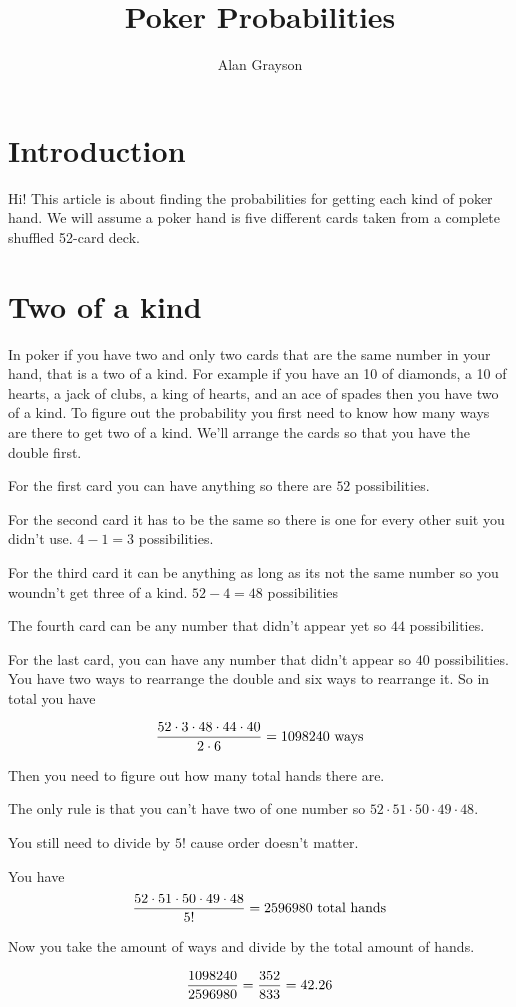 \documentclass[12pt]{article}
\begin{document}
\title{Poker Probabilities}
\author{Alan Grayson}
\maketitle

\section*{Introduction}

Hi! This article is about finding the probabilities for getting each kind of poker hand. 
We will assume a poker hand is five different cards taken from a complete shuffled 52-card deck. 

\section{Two of a kind}

In poker if you have two and only two cards that are the same number in your hand, that is a two of a kind.
For example if you have an 10 of diamonds, a 10 of hearts, a jack of clubs, a king of hearts, and an ace of spades then you have two of a kind.
To figure out the probability you first need to know how many ways are there to get two of a kind.
We'll arrange the cards so that you have the double first.
	
For the first card you can have anything so there are $52$ possibilities.

For the second card it has to be the same so there is one for every other suit you didn't use. $4 - 1 = 3$ possibilities.

For the third card it can be anything as long as its not the same number so you woundn't get three of a kind. $52 - 4 = 48$ possibilities

The fourth card can be any number that didn't appear yet so $44$ possibilities.

For the last card, you can have any number that didn't appear so $40$ possibilities.
You have two ways to rearrange the double and six ways to rearrange it.
So in total you have 

\begin{equation} 
{52 \cdot 3 \cdot 48 \cdot 44 \cdot 40 \over 2 \cdot 6} = 1098240  \hbox{ ways}
\end{equation}

Then you need to figure out how many total hands there are. 

The only rule is that you can't have two of one number so $52 \cdot 51 \cdot 50 \cdot 49 \cdot 48$.

You  still need to divide by $5!$ cause order doesn't matter.

You have 
\begin{equation}
{52 \cdot 51 \cdot 50 \cdot 49 \cdot 48 \over 5!} = 2596980 \hbox{ total hands}
\end{equation}

Now you take the amount of ways and divide by the total amount of hands.

\begin{equation}
{1098240 \over 2596980} = {352 \over 833} = 42.26%
\end{equation}
\end{document}
